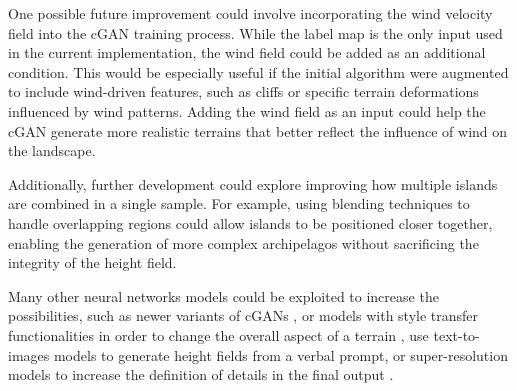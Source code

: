 One possible future improvement could involve incorporating the wind velocity field into the cGAN training process. While the label map is the only input used in the current implementation, the wind field could be added as an additional condition. This would be especially useful if the initial algorithm were augmented to include wind-driven features, such as cliffs or specific terrain deformations influenced by wind patterns. Adding the wind field as an input could help the cGAN generate more realistic terrains that better reflect the influence of wind on the landscape.

Additionally, further development could explore improving how multiple islands are combined in a single sample. For example, using blending techniques to handle overlapping regions could allow islands to be positioned closer together, enabling the generation of more complex archipelagos without sacrificing the integrity of the height field.

Many other neural networks models could be exploited to increase the possibilities, such as newer variants of cGANs \cite{Park2019}, or models with style transfer functionalities \cite{Gatys2015,Zhu2020} in order to change the overall aspect of a terrain \cite{Perche2023a,Perche2023b}, use text-to-images models \cite{Rombach2021,Radford2021} to generate height fields from a verbal prompt, or super-resolution models \cite{Dong2014} to increase the definition of details in the final output \cite{Guerin2016a}.
